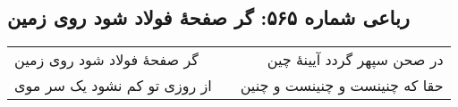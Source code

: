 \begin{center}
\section*{رباعی شماره ۵۶۵: گر صفحهٔ فولاد شود روی زمین}
\label{sec:sh565}
\begin{longtable}{l p{0.5cm} r}
گر صفحهٔ فولاد شود روی زمین
&&
در صحن سپهر گردد آیینهٔ چین
\\
از روزی تو کم نشود یک سر موی
&&
حقا که چنینست و چنینست و چنین
\\
\end{longtable}
\end{center}
